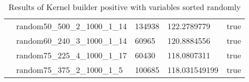 \begin{table}[!htbp]
{\begin{tabular}{@{}lllll@{}}
                & random50\_500\_2\_1000\_1\_14 & 134938 & 122.2789779 & true \\  
                & random60\_240\_3\_1000\_1\_14 & 60965 & 120.8884556 & true \\  
                & random75\_225\_4\_1000\_1\_17 & 60430 & 118.0807311 & true \\  
                & random75\_375\_2\_1000\_1\_5 & 100685 & 118.031549199 & true \\ 
                \bottomrule
        \end{tabular}
        }
    \caption{Results of Kernel builder positive with variables sorted randomly}
    \label{tab:ker_pos_random}
\end{table}
